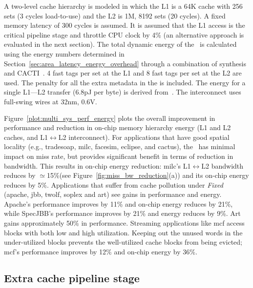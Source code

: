 {{\clearpage

A two-level cache hierarchy is modeled in which the L1 is a 64K cache with 256 sets (3 cycles load-to-use) and the L2 is 1M, 8192 sets (20 cycles). A fixed memory latency of 300 cycles is assumed. It is assumed that the L1 access is the critical pipeline stage and throttle CPU clock by 4\% (an alternative approach is evaluated in the next section).  The total dynamic energy of the \AC\ is calculated using the energy numbers determined in Section~\ref{sec:area_latency_energy_overhead} through a combination of synthesis and CACTI~\cite{Muralimanohar:2007:ONO:1331699.1331704}. 4 fast tags per set at the L1 and 8 fast tags per set at the L2 are used. The penalty for all the extra metadata in the \AC{} is included. The energy for a single L1---L2 transfer (6.8pJ per byte) is derived from~\cite{weti,Muralimanohar:2007:ONO:1331699.1331704}. The interconnect uses full-swing wires at 32nm, 0.6V. 

Figure~\ref{plot:multi_sys_perf_energy} plots the overall improvement in performance and reduction in on-chip memory hierarchy energy (L1 and L2 caches, and L1$\leftrightarrow$L2 interconnect). For applications that have good spatial locality (e.g., tradesoap, milc, facesim, eclipse, and cactus), the \AC\ has minimal impact on miss rate, but provides significant benefit in terms of reduction in bandwidth. This results in on-chip energy reduction: milc's L1$\leftrightarrow$L2 bandwidth reduces by $\simeq$15\%(see Figure~\ref{fig:miss_bw_reduction}(a)) and its on-chip energy reduces by 5\%. Applications that suffer from cache pollution under \textit{Fixed} (apache, jbb, twolf, soplex and art) see gains in performance and energy. Apache's performance improves by 11\% and on-chip energy reduces by 21\%, while SpecJBB's performance improves by 21\% and energy reduces by 9\%. Art gains approximately 50\% in performance.  Streaming applications like mcf access blocks with both low and high utilization. Keeping out the unused words in the under-utilized blocks prevents the well-utilized cache blocks from being evicted; mcf's performance improves by 12\% and on-chip energy by 36\%.

\subsection{Extra cache pipeline stage}
\label{sec:extra_cache_pipeline_stage}

}}
